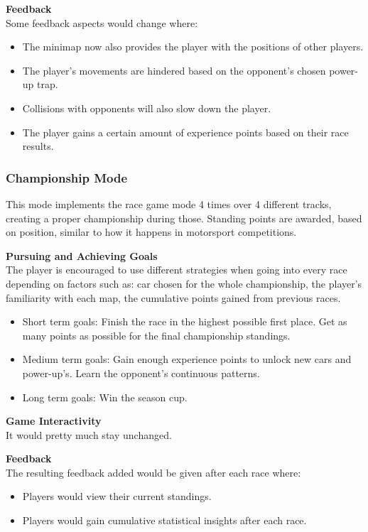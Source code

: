 \documentclass[12pt]{article}
\begin{document}
\noindent\textbf{Feedback}\\
Some feedback aspects would change where:
\begin{itemize}
\item The minimap now also provides the player with the positions of other players.
\item The player’s movements are hindered based on the opponent’s chosen power-up trap.
\item Collisions with opponents will also slow down the player.
\item The player gains a certain amount of experience points based on their race results.
\end{itemize}

\subsubsection{Championship Mode}

This mode implements the race game mode 4 times over 4 different tracks, creating a proper championship during those. Standing points are awarded, based on position, similar to how it happens in motorsport competitions.

\noindent\textbf{Pursuing and Achieving Goals}\\
The player is encouraged to use different strategies when going into every race depending on factors such as: car chosen for the whole championship, the player’s familiarity with each map, the cumulative points gained from previous races.
\begin{itemize}
\item Short term goals: Finish the race in the highest possible first place. Get as many points as possible for the final championship standings.
\item Medium term goals: Gain enough experience points to unlock new cars and power-up’s. Learn the opponent's continuous patterns.
\item Long term goals: Win the season cup.
\end{itemize}

\noindent\textbf{Game Interactivity}\\
It would pretty much stay unchanged.

\noindent\textbf{Feedback}\\
The resulting feedback added would be given after each race where:
\begin{itemize}
\item Players would view their current standings.
\item Players would gain cumulative statistical insights after each race.
\end{itemize}
\end{document}
